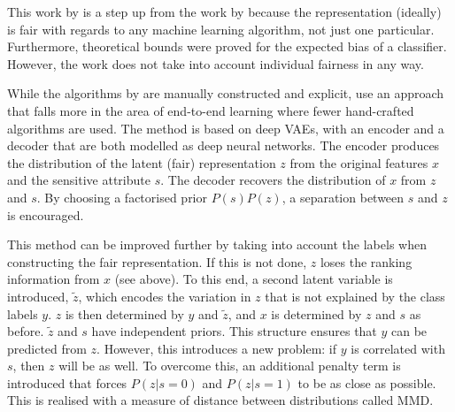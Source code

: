 
This work by \citet{feldman2015certifying} is a step up from the work by \citet{zemel2013learning}
because the representation (ideally) is fair with regards to any machine learning algorithm, not
just one particular. Furthermore, theoretical bounds were proved for the expected bias of a
classifier. However, the work does not take into account individual fairness in any way.

While the algorithms by \citet{feldman2015certifying} are manually constructed and explicit,
\citet{louizos2016variational} use an approach that falls more in the area of end-to-end learning
where fewer hand-crafted algorithms are used. The method is based on deep \acp{VAE}, with an
encoder and a decoder that are both modelled as deep neural networks. The encoder produces the
distribution of the latent (fair) representation \(z\) from the original features \(x\) and the
sensitive attribute \(s\). The decoder recovers the distribution of \(x\) from \(z\) and \(s\). By
choosing a factorised prior \(P(s)P(z)\), a separation between \(s\) and \(z\) is encouraged.

This method can be improved further by taking into account the labels when constructing the fair
representation. If this is not done, \(z\) loses the ranking information from \(x\) (see
\citet{feldman2015certifying} above). To this end, a second latent variable is introduced,
\(\tilde{z}\), which encodes the variation in \(z\) that is not explained by the class labels
\(y\). \(z\) is then determined by \(y\) and \(\tilde{z}\), and \(x\) is determined by \(z\) and
\(s\) as before. \(\tilde{z}\) and \(s\) have independent priors. This structure ensures that \(y\)
can be predicted from \(z\). However, this introduces a new problem: if \(y\) is correlated with
\(s\), then \(z\) will be as well. To overcome this, an additional penalty term is introduced that
forces \(P(z|s=0)\) and \(P(z|s=1)\) to be as close as possible. This is realised with a measure of
distance between distributions called \acf{MMD}.

